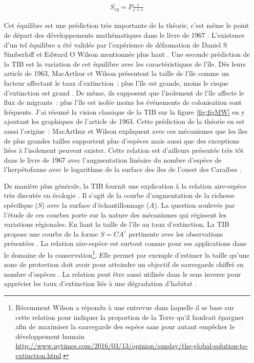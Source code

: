 \begin{eqnarray}
S_{eq} = P \frac{c}{c+e}
\end{eqnarray}

Cet équilibre est une prédiction très importante de la théorie, c'est
même le point de départ des développements mathématiques dans le livre
de 1967 \citep{MacArthur1967}. L'existence d'un tel équilibre a été
validée par l'expérience de défaunation de Daniel S Simberloff et Edward
O Wilson mentionnée plus haut \citep{Simberloff1969}. Une seconde
prédiction de la TIB est la variation de cet équilibre avec les
caractéristiques de l'île. Dès leurs article de 1963, MacArthur et
Wilson présentent la taille de l'île comme un facteur affectant le taux
d'extinction~: plus l'île est grande, moins le risque d'extinction est
grand \citep{MacArthur1963}. De même, ils supposent que l'isolement de
l'île affecte le flux de migrants~: plus l'île est isolée moins les
événements de colonisation sont fréquents. J'ai résumé la vision
classique de la TIB sur la figure \ref{fig:figMW} en y ajoutant les
graphiques de l'article de 1963. Cette prédiction de la théorie en est
aussi l'origine~: MacArthur et Wilson expliquent avec ces mécanismes que
les îles de plus grandes tailles supportent plus d'espèces mais aussi
que des exceptions liées à l'isolement peuvent exister. Cette relation
est d'ailleurs présentée très tôt dans le livre de 1967 avec
l'augmentation linéaire du nombre d'espèce de l'herpétofaune avec le
logarithme de la surface des îles de l'ouest des Caraïbes
\citep[chapitre 2]{MacArthur1967}.

De manière plus générale, la TIB fournit une explication à la relation
aire-espèce très discutée en écologie \citep{Lomolino2000a}. Il s'agit
de la courbe d'augmentation de la richesse spécifique (\(S\)) avec la
surface d'échantillonnage (\(A\)). La question soulevée par l'étude de
ces courbes porte sur la nature des mécanismes qui régissent les
variations régionales. En liant la taille de l'île au taux d'extinction,
La TIB propose une courbe de la forme \(S=CA^z\) pertinente avec les
observations présentées \citep{MacArthur1967}. La relation aire-espèce
est surtout connue pour ses applications dans le domaine de la
conservation\footnote{Récemment Wilson a répondu à une entrevue dans
  laquelle il se base sur cette relation pour indiquer la proportion de
  la Terre qu'il faudrait épargner afin de maximiser la sauvegarde des
  espèce sans pour autant empêcher le développement humain
  \url{http://www.nytimes.com/2016/03/13/opinion/sunday/the-global-solution-to-extinction.html}.}.
Elle permet par exemple d'estimer la taille qu'une zone de protection
doit avoir pour atteindre un objectif de sauvegarde chiffré en nombre
d'espèces \citep{Neigel2003, Desmet2004}. La relation peut être aussi
utilisée dans le sens inverse pour apprécier les taux d'extinction liés
à une dégradation d'habitat \citep{He2011}.

